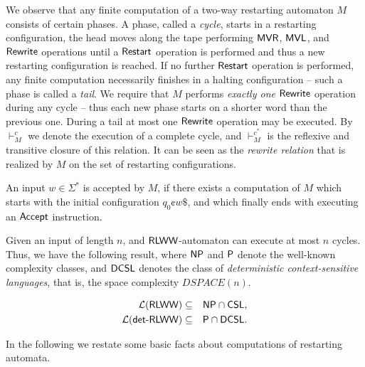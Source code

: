 We observe that any finite computation of a two-way restarting automaton $M$ consists of certain phases. A phase, called a \emph{cycle}, starts in a restarting configuration, the head moves along the tape performing \index{$\MVR$}$\MVR$, \index{$\MVL$}$\MVL$, and \index{$\Rewrite$}$\Rewrite$ operations until a \index{$\Restart$}$\Restart$ operation is performed and thus a new restarting configuration is reached. If no further \index{$\Restart$}$\Restart$ operation is performed, any finite computation necessarily finishes in a halting configuration -- such a phase is called a \emph{tail}. We require that $M$ performs \emph{exactly one} \index{$\Rewrite$}$\Rewrite$ operation during any cycle -- thus each new phase starts on a shorter word than the previous one. During a tail at most one \index{$\Rewrite$}$\Rewrite$ operation may be executed. By $\vdash_M^c$ we denote the execution of a complete cycle, and $\vdash_M^{c^*}$ is the reflexive and transitive closure of this relation. It can be seen as the \emph{rewrite relation} that is realized by $M$ on the set of restarting configurations.

An input $w \in \Sigma^*$ is accepted by $M$, if there exists a computation of $M$ which starts with the initial configuration  $q_0 \cent w \$$, and which finally ends with executing an \index{$\Accept$}$\Accept$ instruction.

Given an input of length $n$, and $\mbox{\sf RLWW}$-automaton can execute at most $n$ cycles. Thus, we have the following result, where $\classNP$ and $\classP$ denote the well-known complexity classes, and $\DCSL$ denotes the class of \emph{deterministic context-sensitive languages}, that is, the space complexity $DSPACE(n)$.

\begin{proposition}
\begin{eqnarray*}
\calL{\RLWW} & \subseteq & \classNP \cap \CSL,\\
\calL{\detRLWW} & \subseteq & \classP \cap \DCSL.
\end{eqnarray*}
\end{proposition}

In the following we restate some basic facts about computations of restarting automata.

